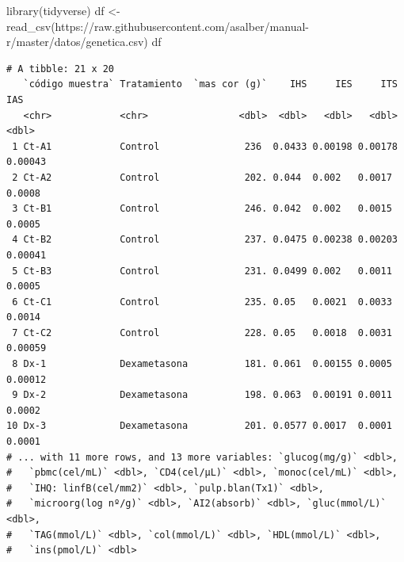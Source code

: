 \documentclass[
  a4paper,
]{scrreport}
\newenvironment{Shaded}{\begin{snugshade}}{\end{snugshade}}
\newcommand{\FunctionTok}[1]{\textcolor[rgb]{0.28,0.35,0.67}{#1}}
\newcommand{\NormalTok}[1]{\textcolor[rgb]{0.00,0.23,0.31}{#1}}
\newcommand{\OtherTok}[1]{\textcolor[rgb]{0.00,0.23,0.31}{#1}}
\newcommand{\StringTok}[1]{\textcolor[rgb]{0.13,0.47,0.30}{#1}}
\theoremstyle{definition}
\theoremstyle{definition}
\theoremstyle{remark}
\begin{document}
\begin{tcolorbox}[enhanced jigsaw, rightrule=.15mm, titlerule=0mm, colbacktitle=quarto-callout-note-color!10!white, toprule=.15mm, coltitle=black, bottomtitle=1mm, opacityback=0, toptitle=1mm, title=\textcolor{quarto-callout-note-color}{\faInfo}\hspace{0.5em}{Solución}, left=2mm, colback=white, breakable, colframe=quarto-callout-note-color-frame, leftrule=.75mm, opacitybacktitle=0.6, arc=.35mm, bottomrule=.15mm]

\begin{Shaded}
\begin{Highlighting}[]
\FunctionTok{library}\NormalTok{(tidyverse)}
\NormalTok{df }\OtherTok{\textless{}{-}} \FunctionTok{read\_csv}\NormalTok{(}\StringTok{\textquotesingle{}https://raw.githubusercontent.com/asalber/manual{-}r/master/datos/genetica.csv\textquotesingle{}}\NormalTok{)}
\NormalTok{df}
\end{Highlighting}
\end{Shaded}

\begin{verbatim}
# A tibble: 21 x 20
   `código muestra` Tratamiento  `mas cor (g)`    IHS     IES     ITS     IAS
   <chr>            <chr>                <dbl>  <dbl>   <dbl>   <dbl>   <dbl>
 1 Ct-A1            Control               236  0.0433 0.00198 0.00178 0.00043
 2 Ct-A2            Control               202. 0.044  0.002   0.0017  0.0008 
 3 Ct-B1            Control               246. 0.042  0.002   0.0015  0.0005 
 4 Ct-B2            Control               237. 0.0475 0.00238 0.00203 0.00041
 5 Ct-B3            Control               231. 0.0499 0.002   0.0011  0.0005 
 6 Ct-C1            Control               235. 0.05   0.0021  0.0033  0.0014 
 7 Ct-C2            Control               228. 0.05   0.0018  0.0031  0.00059
 8 Dx-1             Dexametasona          181. 0.061  0.00155 0.0005  0.00012
 9 Dx-2             Dexametasona          198. 0.063  0.00191 0.0011  0.0002 
10 Dx-3             Dexametasona          201. 0.0577 0.0017  0.0001  0.0001 
# ... with 11 more rows, and 13 more variables: `glucog(mg/g)` <dbl>,
#   `pbmc(cel/mL)` <dbl>, `CD4(cel/µL)` <dbl>, `monoc(cel/mL)` <dbl>,
#   `IHQ: linfB(cel/mm2)` <dbl>, `pulp.blan(Tx1)` <dbl>,
#   `microorg(log nº/g)` <dbl>, `AI2(absorb)` <dbl>, `gluc(mmol/L)` <dbl>,
#   `TAG(mmol/L)` <dbl>, `col(mmol/L)` <dbl>, `HDL(mmol/L)` <dbl>,
#   `ins(pmol/L)` <dbl>
\end{verbatim}

\end{tcolorbox}
\end{document}
